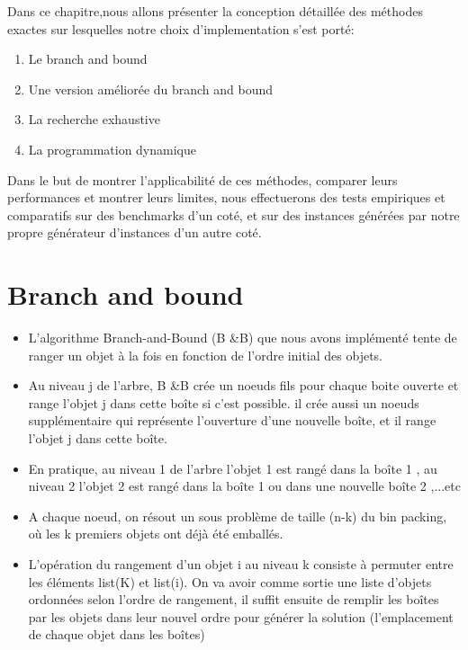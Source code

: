 \documentclass[12pt]{article}
\begin{document}
Dans ce chapitre,nous allons présenter la conception détaillée des méthodes exactes sur lesquelles notre choix d'implementation s'est porté:

\begin{enumerate}

\item Le branch and bound

\item Une version améliorée du branch and bound

\item La recherche exhaustive

\item La programmation dynamique
\end{enumerate}
Dans le but de montrer l’applicabilité de ces méthodes, comparer leurs performances et montrer leurs limites, nous effectuerons des tests empiriques et comparatifs sur des benchmarks d’un coté, et sur des instances générées par notre propre générateur d’instances d’un autre coté.
\section{Branch and bound}
\begin{itemize}
    \item L'algorithme Branch-and-Bound (B \&B) que nous avons implémenté tente de ranger un objet à la fois en fonction de l’ordre initial des objets. 
    \item Au niveau j de l’arbre, B \&B crée un noeuds fils pour chaque boite ouverte et range l’objet j dans cette boîte si c’est possible. il crée aussi un noeuds supplémentaire qui représente l’ouverture d’une nouvelle boîte, et il range l’objet j dans cette boîte.
    \item En pratique, au niveau 1 de l’arbre l’objet 1 est rangé dans la boîte 1 , au niveau 2 l’objet 2 est rangé dans la boîte 1 ou dans une nouvelle boîte 2 ,...etc 
    \item A chaque noeud, on résout un sous problème de taille (n-k) du bin packing, où les k premiers objets ont déjà été emballés.
    \item L’opération du rangement d’un objet i au niveau k consiste à permuter entre les éléments list(K) et list(i). On va avoir comme sortie une liste d’objets ordonnées selon l’ordre de rangement, il suffit ensuite de remplir les boîtes par les objets dans leur nouvel ordre pour générer la solution (l’emplacement de chaque objet dans les boîtes) 
\end{itemize}
\end{document}
